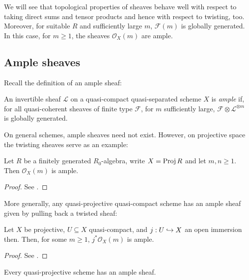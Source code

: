 \documentclass[12pt]{ociamthesis}  %
\begin{document}
We will see that topological properties of sheaves behave well
with respect to taking direct sums and tensor products and hence
with respect to twisting, too. Moreover, for suitable $R$ and
sufficiently large $m$, $\mathscr F(m)$ is globally generated. In this
case, for $m\geq 1$, the sheaves $\mathscr O_X(m)$ are ample.

\subsection{Ample sheaves}

Recall the definition of an ample sheaf:

\begin{definition}
  An invertible sheaf $\mathscr L$ on a quasi-compact quasi-separated
  scheme $X$ is \emph{ample} if, for all quasi-coherent sheaves of
  finite type $\mathscr F$, for $m$ sufficiently large,
  $\mathscr F\otimes \mathscr L^{\otimes m}$ is
  globally generated.
\end{definition}

On general schemes, ample sheaves need not exist. However, on
projective space the twisting sheaves serve as an example:

\begin{proposition}
  Let $R$ be a finitely generated $R_0$-algebra,
  write $X=\operatorname{Proj} R$ and let $m,n\geq 1$. Then
  $\mathscr O_X(m)$ is ample.
  \begin{proof}
    See \cite[Example 13.45]{gortz2010}.
  \end{proof}
\end{proposition}

More generally, any quasi-projective quasi-compact scheme has
an ample sheaf given by pulling back a twisted sheaf:

\begin{proposition}
  Let $X$ be projective, $U\subseteq X$ quasi-compact, and
  $j : U \hookrightarrow X$ an open immersion then. Then, for some $m\geq 1$,
  $j^*\mathscr O_X(m)$ is ample.
  \begin{proof}
    See \cite[\href{https://stacks.math.columbia.edu/tag/01Q2}{Tag 01Q2}]{stacks-project}.
  \end{proof}
\end{proposition}

\begin{corollary}
  Every quasi-projective scheme has an ample sheaf.
\end{corollary}

\end{document}
